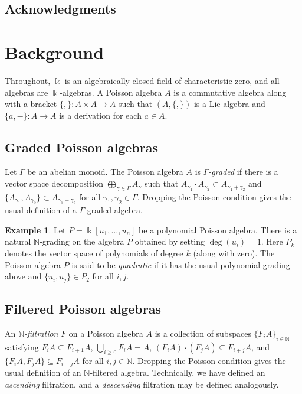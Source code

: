 \documentclass[reqno]{amsart}
\numberwithin{equation}{section}
\theoremstyle{definition}
\newtheorem{example}[theorem]{Example}
\newcommand\kk{\Bbbk}
\newcommand\NN{\mathbb N}
\begin{document}
\subsection*{Acknowledgments}

\section{Background}
\label{sec.back}

Throughout, $\kk$ is an algebraically closed field of characteristic zero, and all algebras are $\kk$-algebras.
A Poisson algebra $A$ is a commutative algebra along with a bracket $\{,\}:A \times A \to A$ such that $(A,\{,\})$ is a Lie algebra and $\{a,-\}:A \to A$ is a derivation for each $a \in A$.

\subsection{Graded Poisson algebras}

Let $\Gamma$ be an abelian monoid. The Poisson algebra $A$ is \emph{$\Gamma$-graded} if there is a vector space decomposition $\bigoplus_{\gamma \in \Gamma} A_{\gamma}$ such that $A_{\gamma_1} \cdot A_{\gamma_2} \subset A_{\gamma_1+\gamma_2}$ and $\{ A_{\gamma_1}, A_{\gamma_2} \} \subset A_{\gamma_1+\gamma_2}$ for all $\gamma_1,\gamma_2 \in \Gamma$. Dropping the Poisson condition gives the usual definition of a $\Gamma$-graded algebra.

\begin{example}\label{ex.quadratic}
Let $P=\kk[u_1,\hdots,u_n]$ be a polynomial Poisson algebra. There is a natural $\NN$-grading on the algebra $P$ obtained by setting $\deg(u_i)=1$. Here $P_k$ denotes the vector space of polynomials of degree $k$ (along with zero). The Poisson algebra $P$ is said to be \emph{quadratic} if it has the usual polynomial grading above and $\{u_i,u_j\} \in P_2$ for all $i,j$.
\end{example}

\subsection{Filtered Poisson algebras}

An \emph{$\NN$-filtration} $F$ on a Poisson algebra $A$ is a collection of subspaces $\{F_i A\}_{i \in \NN}$ satisfying $F_i A \subseteq F_{i+1} A$, $\bigcup_{i \geq 0} F_i A = A$, $(F_i A) \cdot (F_j A) \subseteq F_{i+j}A$, and $\{ F_i A, F_j A\} \subseteq F_{i+j}A$ for all $i,j \in \NN$. Dropping the Poisson condition gives the usual definition of an $\NN$-filtered algebra. Technically, we have defined an \emph{ascending} filtration, and a \emph{descending} filtration may be defined analogously.
\end{document}
